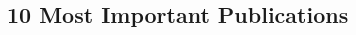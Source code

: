 \documentclass[a4paper,8pt]{article} %
\begin{document}
\begin{thebibliography}{100}
	
%
\section{10 Most Important Publications}%
\vspace{.2cm}








%
%


\end{thebibliography}
\end{document}
